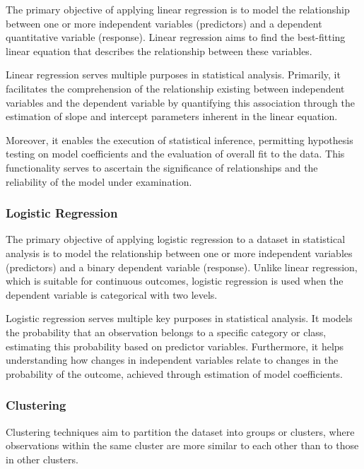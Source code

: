 \documentclass[conference]{IEEEtran}
\begin{document}
\vspace{0.2cm}
The primary objective of applying linear regression is to model the relationship between one or more independent variables (predictors) and a dependent quantitative variable (response). Linear regression aims to find the best-fitting linear equation that describes the relationship between these variables.

Linear regression serves multiple purposes in statistical analysis. Primarily, it facilitates the comprehension of the relationship existing between independent variables and the dependent variable by quantifying this association through the estimation of slope and intercept parameters inherent in the linear equation.

Moreover, it enables the execution of statistical inference, permitting hypothesis testing on model coefficients and the evaluation of overall fit to the data. This functionality serves to ascertain the significance of relationships and the reliability of the model under examination.

\vspace{0.5cm}
\subsubsection{Logistic Regression}
The primary objective of applying logistic regression to a dataset in statistical analysis is to model the relationship between one or more independent variables (predictors) and a binary dependent variable (response). Unlike linear regression, which is suitable for continuous outcomes, logistic regression is used when the dependent variable is categorical with two levels.

Logistic regression serves multiple key purposes in statistical analysis. 
It models the probability that an observation belongs to a specific category or class, estimating this probability based on predictor variables.
Furthermore, it helps understanding how changes in independent variables relate to changes in the probability of the outcome, achieved through estimation of model coefficients.

\vspace{0.5cm}
\subsubsection{Clustering}

Clustering techniques aim to partition the dataset into groups or clusters, where observations within the same cluster are more similar to each other than to those in other clusters.
\end{document}
